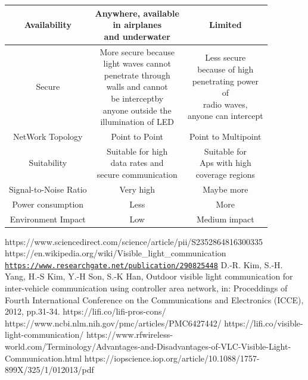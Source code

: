 \documentclass[conference]{IEEEtran}
\begin{document}
\begin{table}[H]
\begin{tabular}{c c c}
Availability & \makecell{Anywhere, available\\in airplanes \\and underwater}&Limited  \\   \hline
Secure&\makecell{More secure because\\light waves cannot\\penetrate through\\walls
and cannot\\be interceptby\\anyone outside the\\illumination of LED}&\makecell{Less secure \\because of high\\ penetrating power\\of \\radio waves,\\anyone can intercept } \\   \hline
NetWork Topology & Point to Point & Point to Multipoint  \\   \hline
Suitability & \makecell{Suitable for high\\ data rates and \\secure communication}&  \makecell{Suitable for\\ Aps with high\\ coverage regions} \\   \hline
Signal-to-Noise Ratio & Very high & Maybe more  \\   \hline
Power consumption &Less& More  \\   \hline
Environment Impact & Low  & Medium impact\\  [1ex]  \hline %

\hline\hline %

\end{tabular}
\label{table:nonlin} %
\end{table}

\begin{thebibliography}{00}
https://www.sciencedirect.com/science/article/pii/S2352864816300335
https://en.wikipedia.org/wiki/Visible\_light\_communication
\href{https://www.researchgate.net/publication/290825448\_VLC\_technology\_for\_indoor\_LTE\_planning}{\nolinkurl{https://www.researchgate.net/publication/290825448}}
 D.-R. Kim, S.-H. Yang, H.-S Kim, Y.-H Son, S.-K Han, Outdoor visible light
communication for inter-vehicle communication using controller area network, in:
Proceddings of Fourth International Conference on the Communications and
Electronics (ICCE), 2012, pp.31-34.
https://lifi.co/lifi-pros-cons/
https://www.ncbi.nlm.nih.gov/pmc/articles/PMC6427442/
https://lifi.co/visible-light-communication/
https://www.rfwireless-world.com/Terminology/Advantages-and-Disadvantages-of-VLC-Visible-Light-Communication.html
https://iopscience.iop.org/article/10.1088/1757-899X/325/1/012013/pdf 
\end{thebibliography}
\vspace{12pt}
\end{document}
